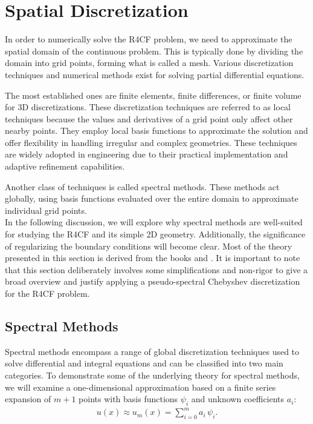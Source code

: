 
\section{Spatial Discretization} \label{sec:spectral}

In order to numerically solve the R4CF problem, we need to approximate the
spatial domain of the continuous problem. This is typically done by dividing
the domain into grid points, forming what is called a mesh. Various
discretization techniques and numerical methods exist for solving partial
differential equations.

The most established ones are finite elements, finite differences, or finite
volume for 3D discretizations. These discretization techniques are referred to
as local techniques because the values and derivatives of a grid point only
affect other nearby points. They employ local basis functions to approximate
the solution and offer flexibility in handling irregular and complex
geometries. These techniques are widely adopted in engineering due to their
practical implementation and adaptive refinement capabilities.

Another class of techniques is called spectral methods. These methods act
globally, using basis functions evaluated over the entire domain to approximate
individual grid points. \\

In the following discussion, we will explore why spectral methods are
well-suited for studying the R4CF and its simple 2D geometry. Additionally, the
significance of regularizing the boundary conditions will become clear. Most of
the theory presented in this section is derived from the books \citet{boyd2001}
and \citet{canuto2006}. It is important to note that this section deliberately
involves some simplifications and non-rigor to give a broad overview and
justify applying a pseudo-spectral Chebyshev discretization for the R4CF
problem.

\subsection{Spectral Methods}

Spectral methods encompass a range of global discretization techniques used to
solve differential and integral equations and can be classified into two main
categories. To demonstrate some of the underlying theory for spectral methods,
we will examine a one-dimensional approximation based on a finite series
expansion of $m+1$ points with basis functions $\psi_i$ and unknown
coefficients $a_i$:
\begin{align}
u(x) \approx u_m(x) = \sum_{i=0}^{m} a_i \, \psi_i. 
\label{eq:approx}
\end{align}


